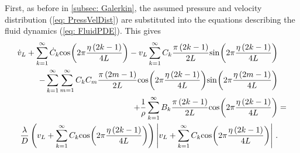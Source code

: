 First, as before in \cref{subsec: Galerkin}, the assumed pressure and velocity distribution (\cref{eq: PressVelDist}) are substituted into the equations describing the fluid dynamics (\cref{eq: FluidPDE}). This gives
~
\begin{equation*}
\begin{split}
    \dot{v}_L
    + \sum_{k=1}^{\infty} \dot{C}_k \fun{cos}{2\pi \frac{\eta \left( 2 k - 1 \right)}{4L}}
    - v_L \sum_{k=1}^{\infty} C_k \frac{\pi \left( 2 k - 1 \right)}{2L} \fun{sin}{2\pi \frac{\eta \left( 2 k - 1 \right)}{4L}}
    & \\ %
    - \sum_{k=1}^{\infty} \sum_{m=1}^{\infty} C_k C_m \frac{\pi \left( 2 m - 1 \right)}{2L} \fun{cos}{2\pi \frac{\eta \left( 2 k - 1 \right)}{4L}} \fun{sin}{2\pi \frac{\eta \left( 2 m - 1 \right)}{4L}} 
    & \\ %
    + \frac{1}{\rho} \sum_{k=1}^{\infty} B_k \frac{\pi \left( 2 k - 1 \right)}{2L} \fun{cos}{2\pi \frac{\eta \left( 2 k - 1 \right)}{4L}}
    &= \\ %
    \frac{\lambda}{D} \left( v_L + \sum_{k=1}^{\infty} C_k \fun{cos}{2\pi \frac{\eta \left( 2 k - 1 \right)}{4L}} \right) \left| v_L + \sum_{k=1}^{\infty} C_k \fun{cos}{2\pi \frac{\eta \left( 2 k - 1 \right)}{4L}} \right| \, .
\end{split}
\end{equation*}

